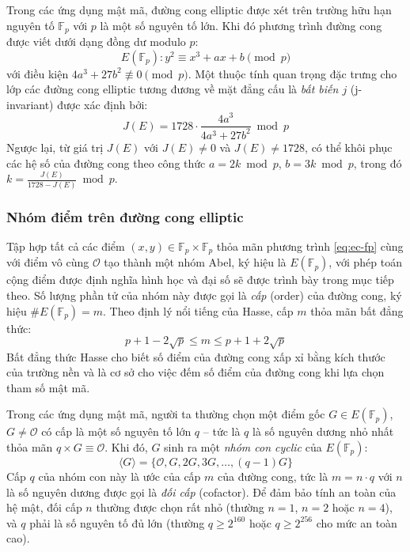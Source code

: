 Trong các ứng dụng mật mã, đường cong elliptic được xét trên trường hữu hạn nguyên tố $\mathbb{F}_p$ với $p$ là một số nguyên tố lớn. Khi đó phương trình đường cong được viết dưới dạng đồng dư modulo $p$:
\begin{equation}
E(\mathbb{F}_p): y^2 \equiv x^3 + ax + b \pmod{p}
\label{eq:ec-fp}
\end{equation}
với điều kiện $4a^3 + 27b^2 \not\equiv 0 \pmod{p}$. Một thuộc tính quan trọng đặc trưng cho lớp các đường cong elliptic tương đương về mặt đẳng cấu là \textit{bất biến $j$} (j-invariant) được xác định bởi:
\begin{equation}
J(E) = 1728 \cdot \frac{4a^3}{4a^3 + 27b^2} \bmod p
\label{eq:ec-jinvariant}
\end{equation}
Ngược lại, từ giá trị $J(E)$ với $J(E) \neq 0$ và $J(E) \neq 1728$, có thể khôi phục các hệ số của đường cong theo công thức $a = 2k \bmod p$, $b = 3k \bmod p$, trong đó $k = \frac{J(E)}{1728 - J(E)} \bmod p$.

\subsubsection{Nhóm điểm trên đường cong elliptic}

Tập hợp tất cả các điểm $(x, y) \in \mathbb{F}_p \times \mathbb{F}_p$ thỏa mãn phương trình \eqref{eq:ec-fp} cùng với điểm vô cùng $\mathcal{O}$ tạo thành một nhóm Abel, ký hiệu là $E(\mathbb{F}_p)$, với phép toán cộng điểm được định nghĩa hình học và đại số sẽ được trình bày trong mục tiếp theo. Số lượng phần tử của nhóm này được gọi là \textit{cấp} (order) của đường cong, ký hiệu $\#E(\mathbb{F}_p) = m$. Theo định lý nổi tiếng của Hasse, cấp $m$ thỏa mãn bất đẳng thức:
\begin{equation}
p + 1 - 2\sqrt{p} \leq m \leq p + 1 + 2\sqrt{p}
\label{eq:hasse}
\end{equation}
Bất đẳng thức Hasse cho biết số điểm của đường cong xấp xỉ bằng kích thước của trường nền và là cơ sở cho việc đếm số điểm của đường cong khi lựa chọn tham số mật mã.

Trong các ứng dụng mật mã, người ta thường chọn một điểm gốc $G \in E(\mathbb{F}_p)$, $G \neq \mathcal{O}$ có cấp là một số nguyên tố lớn $q$ -- tức là $q$ là số nguyên dương nhỏ nhất thỏa mãn $q \times G \equiv \mathcal{O}$. Khi đó, $G$ sinh ra một \textit{nhóm con cyclic} của $E(\mathbb{F}_p)$:
\begin{equation}
\langle G \rangle = \{\mathcal{O}, G, 2G, 3G, \ldots, (q-1)G\}
\label{eq:cyclic-subgroup}
\end{equation}
Cấp $q$ của nhóm con này là ước của cấp $m$ của đường cong, tức là $m = n \cdot q$ với $n$ là số nguyên dương được gọi là \textit{đối cấp} (cofactor). Để đảm bảo tính an toàn của hệ mật, đối cấp $n$ thường được chọn rất nhỏ (thường $n = 1$, $n = 2$ hoặc $n = 4$), và $q$ phải là số nguyên tố đủ lớn (thường $q \geq 2^{160}$ hoặc $q \geq 2^{256}$ cho mức an toàn cao).


